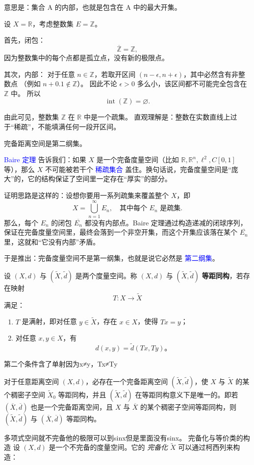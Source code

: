 意思是：集合 A 的内部，也就是包含在 A 中的最大开集。
\begin{example}
设 $X = \mathbb{R}$，考虑整数集 $E = \mathbb{Z}$。

首先，闭包：
\[
\overline{\mathbb{Z}} = \mathbb{Z},
\]
因为整数集中的每个点都是孤立点，没有新的极限点。

其次，内部：
对于任意 $n \in \mathbb{Z}$，若取开区间 $(n-\epsilon, n+\epsilon)$，其中必然含有非整数点
（例如 $n+0.1 \notin \mathbb{Z}$）。
因此不论 $\epsilon > 0$ 多么小，该区间都不可能完全包含在 $\mathbb{Z}$ 中。
所以
\[
\operatorname{int}(\mathbb{Z}) = \varnothing.
\]

由此可见，整数集 $\mathbb{Z}$ 在 $\mathbb{R}$ 中是一个疏集。
直观理解是：整数在实数直线上过于“稀疏”，不能填满任何一段开区间。
\end{example}
\begin{theorem}[Baire 定理]
完备距离空间是第二纲集。
\end{theorem}
\textcolor{blue}{Baire 定理} 告诉我们：如果 $X$ 是一个完备度量空间（比如 $\mathbb{R}, \mathbb{R}^n, \ell^2, C[0,1]$ 等），那么 $X$ 不可能被若干个 \textcolor{blue}{稀疏集合} 盖住。换句话说，完备度量空间是“庞大”的，它的结构保证了空间里一定存在“厚实”的部分。

证明思路是这样的：设想你要用一系列疏集来覆盖整个 $X$，即
\[
X = \bigcup_{n=1}^\infty E_n, \quad \text{其中每个 $E_n$ 是疏集}.
\]
那么，每个 $E_n$ 的闭包 $\overline{E_n}$ 都没有内部点。Baire 定理通过构造递减的闭球序列，保证在完备度量空间里，最终会落到一个非空开集，而这个开集应该落在某个 $\overline{E_n}$ 里，这就和“它没有内部”矛盾。

于是推出：完备度量空间不是第一纲集，也就是说它必然是 \textcolor{blue}{第二纲集}。
\begin{definition}[等距同构]
设 $(X,d)$ 与 $(\widetilde{X},\widetilde{d})$ 是两个度量空间。称 $(X,d)$ 与 $(\widetilde{X},\widetilde{d})$ \textbf{等距同构}，若存在映射 
\[
T: X \to \widetilde{X}
\]
满足：
\begin{enumerate}
    \item $T$ 是满射，即对任意 $y \in \widetilde{X}$，存在 $x \in X$，使得 $Tx = y$；
    \item 对任意 $x,y \in X$，有
    \[
    d(x,y) = \widetilde{d}(Tx,Ty)。
    \]
\end{enumerate}
\end{definition}
第二个条件含了单射因为x≠y，Tx≠Ty
\begin{theorem}[距离空间的完备化定理]
对于任意距离空间 $(X,d)$，必存在一个完备距离空间 $(\tilde{X}, \tilde{d})$，使 $X$ 与 $\tilde{X}$ 的某个稠密子空间 $\tilde{X}_0$ 等距同构，并且 $(\tilde{X}, \tilde{d})$ 在等距同构意义下是唯一的。即若 $(\overline{X}, \overline{d})$ 也是一个完备距离空间，且 $X$ 与 $\overline{X}$ 的某个稠密子空间等距同构，则 $(\tilde{X}, \tilde{d})$ 与 $(\overline{X}, \overline{d})$ 等距同构。
\end{theorem}
多项式空间就不完备他的极限可以到sinx但是里面没有sinx。
{完备化与等价类的构造}  
设 $(X,d)$ 是一个不完备的度量空间。它的 \emph{完备化} $\tilde{X}$ 可以通过柯西列来构造：

